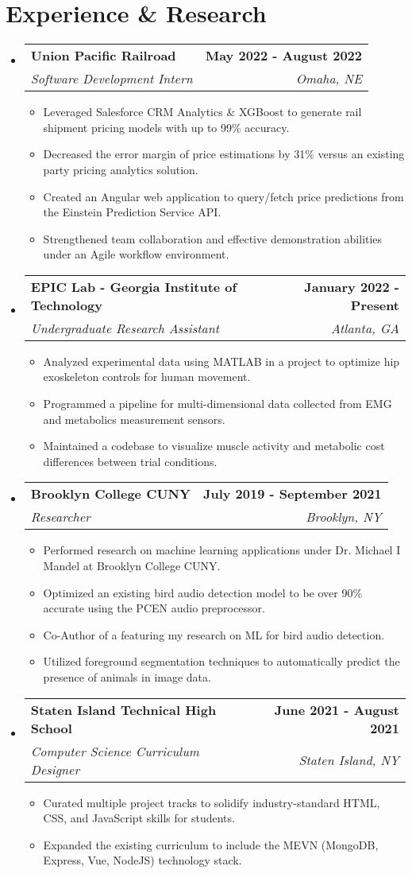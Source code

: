 \documentclass[letterpaper,11pt]{article}
\makeatletter
\newcommand{\myuline}[1]{%
  \uline{\phantom{#1}}%
  \llap{\contour{white}{#1}}%
}
\newcommand{\resumeItem}[1]{
  \item\small{
    {#1 \vspace{-2pt}}
  }
}
\newcommand{\resumeSubheading}[4]{
  \vspace{-2pt}\item
    \begin{tabular*}{1.0\textwidth}[t]{l@{\extracolsep{\fill}}r}
      \textbf{#1} & \textbf{\small #2} \\
      \textit{\small#3} & \textit{\small #4} \\
    \end{tabular*}\vspace{-7pt}
}
\newcommand{\resumeSubHeadingListStart}{\begin{itemize}[leftmargin=0.0in, label={}]}
\newcommand{\resumeSubHeadingListEnd}{\end{itemize}}
\newcommand{\resumeItemListStart}{\begin{itemize}[leftmargin=0.15in]}
\newcommand{\resumeItemListEnd}{\end{itemize}\vspace{-5pt}}
\makeatother
\begin{document}
\section{Experience \& Research}
\resumeSubHeadingListStart
\resumeSubheading
{Union Pacific Railroad}{May 2022 - August 2022}
{Software Development Intern}{Omaha, NE}
\resumeItemListStart
\resumeItem{Leveraged Salesforce CRM Analytics \& XGBoost to generate rail shipment pricing models with up to 99\% accuracy.}
\resumeItem{Decreased the error margin of price estimations by 31\% versus an existing \nth{3} party pricing analytics solution.}
\resumeItem{Created an Angular web application to query/fetch price predictions from the Einstein Prediction Service API.}
\resumeItem{Strengthened team collaboration and effective demonstration abilities under an Agile workflow environment.}
\resumeItemListEnd
\resumeSubheading
{EPIC Lab - Georgia Institute of Technology}{January 2022 - Present}
{Undergraduate Research Assistant}{Atlanta, GA}
\resumeItemListStart
\resumeItem{Analyzed experimental data using MATLAB in a project to optimize hip exoskeleton controls for human movement.}
\resumeItem{Programmed a pipeline for multi-dimensional data collected from EMG and metabolics measurement sensors.}
\resumeItem{Maintained a codebase to visualize muscle activity and metabolic cost differences between trial conditions.}
\resumeItemListEnd
\resumeSubheading
{Brooklyn College CUNY}{July 2019 - September 2021}
{Researcher}{Brooklyn, NY}
\resumeItemListStart
\resumeItem{Performed research on machine learning applications under Dr. Michael I Mandel at Brooklyn College CUNY.}
\resumeItem{Optimized an existing bird audio detection model to be over 90\% accurate using the PCEN audio preprocessor.}
\resumeItem{Co-Author of a \href{https://ieeexplore.ieee.org/document/9053338}{\myuline{2020 IEEE ICASSP conference paper}} featuring my research on ML for bird audio detection.}
\resumeItem{Utilized foreground segmentation techniques to automatically predict the presence of animals in image data.}
\resumeItemListEnd
\resumeSubheading
{Staten Island Technical High School}{June 2021 - August 2021}
{Computer Science Curriculum Designer}{Staten Island, NY}
\resumeItemListStart
\resumeItem{Curated multiple project tracks to solidify industry-standard HTML, CSS, and JavaScript skills for students.}
\resumeItem{Expanded the existing curriculum to include the MEVN (MongoDB, Express, Vue, NodeJS) technology stack.}
\resumeItemListEnd
\resumeSubHeadingListEnd
\vspace{-16pt}
\end{document}
